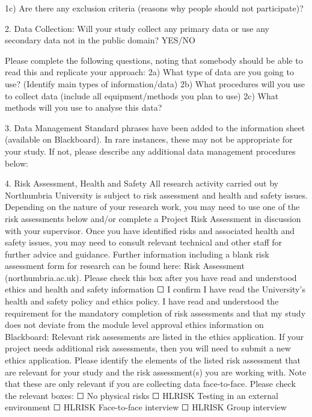 \documentclass[../CHEFCookingHelperForEveryonesFridge.tex]{subfiles}
\begin{document}
1c) Are there any exclusion criteria (reasons why people should not participate)?


2.	Data Collection: Will your study collect any primary data or use any secondary data not in the public domain?                              						YES/NO

Please complete the following questions, noting that somebody should be able to read this and replicate your approach:
2a) What type of data are you going to use? (Identify main types of information/data)
2b) What procedures will you use to collect data (include all equipment/methods you plan to use)
2c) What methods will you use to analyse this data?

3.	Data Management
Standard phrases have been added to the information sheet (available on Blackboard). In rare instances, these may not be appropriate for your study. If not, please describe any additional data management procedures below:

4.	Risk Assessment, Health and Safety
All research activity carried out by Northumbria University is subject to risk assessment and health and safety issues. Depending on the nature of your research work, you may need to use one of the risk assessments below and/or complete a Project Risk Assessment in discussion with your supervisor. Once you have identified risks and associated health and safety issues, you may need to consult relevant technical and other staff for further advice and guidance. Further information including a blank risk assessment form for research can be found here: Risk Assessment (northumbria.ac.uk).
Please check this box after you have read and understood ethics and health and safety information
☐   I confirm I have read the University's health and safety policy and ethics policy. I have read and understood the requirement for the mandatory completion of risk assessments and that my study does not deviate from the module level approval ethics information on Blackboard:  Relevant risk assessments are listed in the ethics application. If your project needs additional risk assessments, then you will need to submit a new ethics application. Please identify the elements of the listed risk assessment that are relevant for your study and the risk assessment(s) you are working with. Note that these are only relevant if you are collecting data face-to-face.
Please check the relevant boxes:
☐   No physical risks
☐   HL\textunderscore RISK Testing in an external environment
☐   HL\textunderscore RISK Face-to-face interview
☐   HL\textunderscore RISK Group interview
\end{document}
